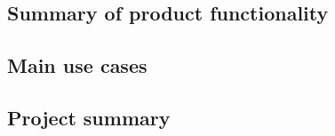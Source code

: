 \subsection{Summary of product functionality}

\subsection{Main use cases}

\subsection{Project summary}


